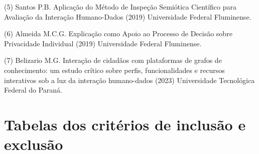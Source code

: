\documentclass[
	12pt,				%
	oneside,			%
	a4paper,			%
	english,			%
	brazil				%
	]{abntex2ppgsi}
\begin{document}
\begin{apendicesenv}
(5) Santos P.B. Aplicação do Método de Inspeção Semiótica Científico para Avaliação da Interação Humano-Dados (2019) Universidade Federal Fluminense.

(6) Almeida M.C.G. Explicação como Apoio ao Processo de Decisão sobre Privacidade Individual (2019) Universidade Federal Fluminense.

(7) Belizario M.G. Interação de cidadãos com plataformas de grafos de conhecimento: um estudo crítico sobre perfis, funcionalidades e recursos interativos sob a luz da interação humano-dados (2023) Universidade Tecnológica Federal do Paraná.


\chapter{Tabelas dos critérios de inclusão e exclusão}\label{Apendice_B}


\end{apendicesenv}
\end{document}
